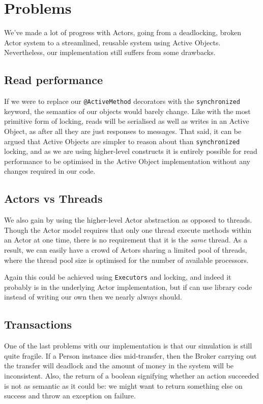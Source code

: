 \documentclass[a4paper,12pt]{kth-mag}
\begin{document}
\section{Problems}

We've made a lot of progress with Actors, going from a deadlocking, broken Actor system to a streamlined, reusable system using Active Objects. Nevertheless, our implementation still suffers from some drawbacks.

\subsection{Read performance}

If we were to replace our \texttt{@ActiveMethod} decorators with the \texttt{synchronized} keyword, the semantics of our objects would barely change. Like with the most primitive form of locking, reads will be serialised as well as writes in an Active Object, as after all they are just responses to messages. That said, it can be argued that Active Objects are simpler to reason about than \texttt{synchronized} locking, and as we are using higher-level constructs it is entirely possible for read performance to be optimised in the Active Object implementation without any changes required in our code.

\subsection{Actors vs Threads}

We also gain by using the higher-level Actor abstraction as opposed to threads. Though the Actor model requires that only one thread execute methods within an Actor at one time, there is no requirement that it is the \textit{same} thread. As a result, we can easily have a crowd of Actors sharing a limited pool of threads, where the thread pool size is optimised for the number of available processors. 

Again this could be achieved using \texttt{Executors} and locking, and indeed it probably is in the underlying Actor implementation, but if can use library code instead of writing our own then we nearly always should.

\subsection{Transactions}

One of the last problems with our implementation is that our simulation is still quite fragile. If a Person instance dies mid-transfer, then the Broker carrying out the transfer will deadlock and the amount of money in the system will be inconsistent.  Also, the return of a boolean signifying whether an action succeeded is not as semantic as it could be: we might want to return something else on success and throw an exception on failure.
\end{document}
